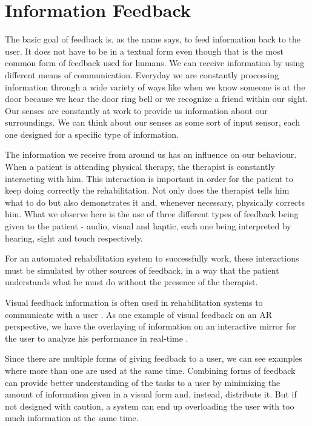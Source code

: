 \section{Information Feedback}
\label{RW-MF}

The basic goal of feedback is, as the name says, to feed information back to the user. 
It does not have to be in a textual form even though that is the most 
common form of feedback used for humans. We can receive information 
by using different means of communication. 
Everyday we are constantly processing information through a wide variety of ways like when 
we know someone is at the door because we hear the door ring bell or we recognize a friend within our sight.
Our senses are constantly at work to provide us information about our surroundings.
We can think about our senses as some sort of input sensor, each one designed for a specific type of information.

The information we receive from around us has an influence on our behaviour.
When a patient is attending physical therapy, the therapist is constantly interacting with him. 
This interaction is important in order for the patient to keep doing correctly the rehabilitation.
Not only does the therapist tells him what to do but also demonstrates it and, whenever necessary, physically corrects him.
What we observe here is the use of three different types of feedback being given to the patient - audio, visual and haptic,
each one being interpreted by hearing, sight and touch respectively.

For an automated rehabilitation system to successfully work, these interactions must 
be simulated by other sources of feedback, in a way that the patient understands 
what he must do without the presence of the therapist.

Visual feedback information is often used in rehabilitation systems to communicate with a user \cite{Design2005}. 
As one example of visual feedback on an \ac{AR} perspective, we have the overlaying of 
information on an interactive mirror for the user to analyze his performance in real-time \cite{Anderson,Tang2014a,Velloso2013,Klein2013,Alhamid2012a,blum2012}. 

Since there are multiple forms of giving feedback to a user, we can see examples where more than one are used at the same time.
Combining forms of feedback can provide better understanding of the tasks to a user by minimizing the amount of 
information given in a visual form and, instead, distribute it. 
But if not designed with caution, a system can end up overloading the user with too much information at the same time. 

